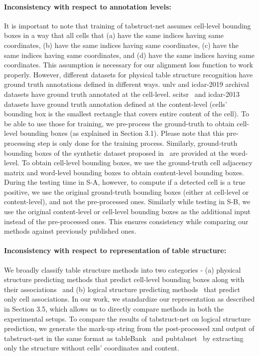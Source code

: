 \documentclass[runningheads]{llncs}
\begin{document}
\paragraph{\textbf{Inconsistency with respect to annotation levels:}} It is important to note that training of {\sc t}ab{\sc s}truct-{\sc n}et assumes cell-level bounding boxes in a way that all cells that (a) have the same  indices having same  coordinates, (b) have the same  indices having same  coordinates, (c) have the same  indices having same  coordinates, and (d) have the same  indices having same  coordinates. This assumption is necessary for our alignment loss function to work properly. However, different datasets for physical table structure recognition have ground truth annotations defined in different ways. {\sc unlv} and {\sc icdar}-2019 archival datasets have ground truth annotated at the cell-level. {\sc s}ci{\sc tsr}~\cite{chi2019complicated} and {\sc icdar}-2013~\cite{gobel2013icdar} datasets have ground truth annotation defined at the content-level (cells' bounding box is the smallest rectangle that covers entire content of the cell). To be able to use those for training, we pre-process the ground-truth to obtain cell-level bounding boxes (as explained in Section 3.1). Please note that this pre-processing step is only done for the training process. Similarly, ground-truth bounding boxes of the synthetic dataset proposed in~\cite{qasim2019rethinking} are provided at the word-level. To obtain cell-level bounding boxes, we use the ground-truth cell adjacency matrix and word-level bounding boxes to obtain content-level bounding boxes. During the testing time in S-A, however, to compute if a detected cell is a true positive, we use the original ground-truth bounding boxes (either at cell-level or content-level), and not the pre-processed ones. Similarly while testing in S-B, we use the original content-level or cell-level bounding boxes as the additional input instead of the pre-processed ones. This ensures consistency while comparing our methods against previously published ones.
    
\paragraph{\textbf{Inconsistency with respect to representation of table structure:}} We broadly classify table structure methods into two categories - (a) physical structure predicting methods that predict cell-level bounding boxes along with their associations~\cite{schreiber2017deepdesrt,table_splitting,Khan_2019} and (b) logical structure predicting methods~\cite{qasim2019rethinking,li2019tablebank,paliwal2019tablenet,chi2019complicated} that predict only cell associations. In our work, we standardize our representation as described in Section 3.5, which allows us to directly compare methods in both the experimental setups. To compare the results of {\sc t}ab{\sc s}truct-{\sc n}et on logical structure prediction, we generate the mark-up string from the post-processed {\sc xml} output of {\sc t}ab{\sc s}truct-{\sc n}et in the same format as {\sc t}able{\sc B}ank~\cite{li2019tablebank} and {\sc p}ub{\sc t}ab{\sc n}et~\cite{zhong2019image} by extracting only the structure without cells' coordinates and content.
\end{document}
